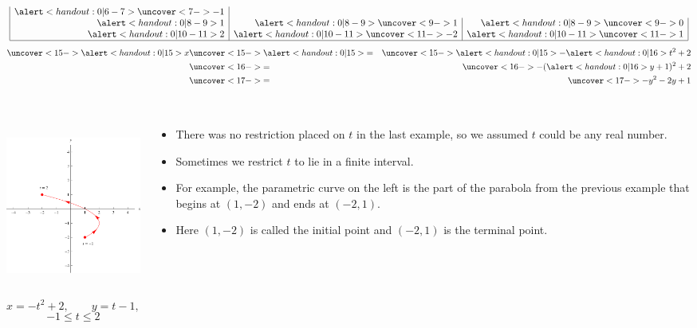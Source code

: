 \begin{frame}
\begin{example}
\begin{columns}[c]
\[\begin{array}{|r|r|r|}
\alert<handout:0| 6-7>{\uncover<7->{-1}} \\%
\alert<handout:0| 8-9>{1} &%
\alert<handout:0| 8-9>{\uncover<9->{1}} &%
\alert<handout:0| 8-9>{\uncover<9->{0}} \\%
\alert<handout:0| 10-11>{2} &%
\alert<handout:0| 10-11>{\uncover<11->{-2}} &%
\alert<handout:0| 10-11>{\uncover<11->{1}} \\%
\hline
\end{array}
\]
%
%
\abovedisplayskip=2pt
\belowdisplayskip=2pt
\begin{eqnarray*}
\uncover<15->{%
\alert<handout:0| 15>{x}%
}%
&\uncover<15->{\alert<handout:0| 15>{ =}}&%
\uncover<15->{%
\alert<handout:0| 15>{ -\alert<handout:0| 16>{t}^2 + 2}%
}\\%
& \uncover<16->{ = }&%
\uncover<16->{%
 -(\alert<handout:0| 16>{y+1})^2 + 2
}\\%
& \uncover<17->{ = }&%
\uncover<17->{%
-y^2 - 2y + 1
}%
\end{eqnarray*}
\end{columns}
\end{example}
\end{frame}

\begin{frame}
\begin{columns}[c]
\includegraphics[height=6cm]{parametric-curves/pictures/11-01-ex1chopped.pdf}%
\[
x = -t^2 + 2, \qquad y = t - 1,
\]
\[
 -1 \leq t \leq 2
\]
\begin{itemize}
\item  There was no restriction placed on $t$ in the last example, so we assumed $t$ could be any real number.
\item  Sometimes we restrict $t$ to lie in a finite interval.
\item  For example, the parametric curve on the left is the part of the parabola from the previous example that begins at $(1,-2)$ and ends at $(-2,1)$.
\item  Here $(1,-2)$ is called the initial point and $(-2,1)$ is the terminal point.
\end{itemize}
\end{columns}
\end{frame}
